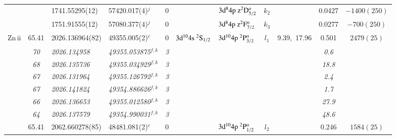 \documentclass[useAMS,usenatbib]{mn2e}
\begin{document}
\begin{table*}
\begin{center}
\begin{minipage}{0.977\textwidth}
\begin{tabular}{lcllcllcccc}
              &        & 1741.55295(12)     & 57420.017(4)$^j$         & 0    &                                            & $3\rm{d}^84\rm{p~z}^2\rm{D}_{5/2}^{\rm{o}}$        & $k_2$  &              &  0.0427 & $-1400(250)$\\
              &        & 1751.91555(12)     & 57080.377(4)$^j$         & 0    &                                            & $3\rm{d}^84\rm{p~z}^2\rm{F}_{7/2}^{\rm{o}}$        & $k_3$  &              &  0.0277 & $ -700(250)$\\
Zn{\sc \,ii}  & 65.41  & 2026.136964(82)    & 49355.005(2)$^c$         & 0    & $3\rm{d}^{10}4\rm{s}~^2\rm{S}_{1/2}$       & $3\rm{d}^{10}4\rm{p}~^2\rm{P}_{3/2}^{\rm{o}}$      & $l_1$  & 9.39,~17.96  &  0.501  & $ 2479(25) $\\
              & \it{70}& \it{2026.134958}   & \it{49355.053875}$^{f,k}$&\it{3}&                                            &                                                    &        &              & \it{0.6}& $          $\\
              & \it{68}& \it{2026.135736}   & \it{49355.034929}$^{f,k}$&\it{3}&                                            &                                                    &        &              &\it{18.8}& $          $\\
              & \it{67}& \it{2026.131964}   & \it{49355.126792}$^{f,k}$&\it{3}&                                            &                                                    &        &              & \it{2.4}& $          $\\
              & \it{67}& \it{2026.141824}   & \it{49354.886626}$^{f,k}$&\it{3}&                                            &                                                    &        &              & \it{1.7}& $          $\\
              & \it{66}& \it{2026.136653}   & \it{49355.012580}$^{f,k}$&\it{3}&                                            &                                                    &        &              &\it{27.9}& $          $\\
              & \it{64}& \it{2026.137579}   & \it{49354.990031}$^{f,k}$&\it{3}&                                            &                                                    &        &              &\it{48.6}& $          $\\
              & 65.41  & 2062.660278(85)    & 48481.081(2)$^c$         & 0    &                                            & $3\rm{d}^{10}4\rm{p}~^2\rm{P}_{1/2}^{\rm{o}}$      & $l_2$  &              &  0.246  & $ 1584(25) $\\

\end{tabular}
\end{minipage}
\end{center}
\end{table*}
\end{document}
